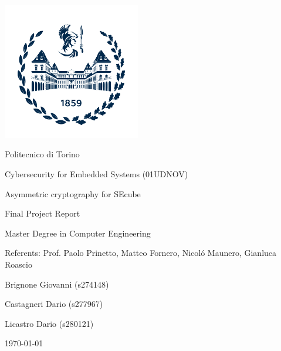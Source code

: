 \documentclass[10pt,  english, a4paper, titlepage, oneside]{book}
\begin{document}
\frontmatter
\begin{titlepage}
\vspace{0cm}
\centerline{
\includegraphics[width=6cm]{./logopolitonuovo}} 
\vspace{0.5cm}
\centerline{\LARGE Politecnico di Torino}
\vspace{2.5cm}
\centerline{\huge Cybersecurity for Embedded Systems (01UDNOV)}
\vspace{1cm}
\centerline{\Huge Asymmetric cryptography for SEcube}
\bigskip
\centerline{\huge Final Project Report}
\vspace{2cm}
\centerline{\Large Master Degree in Computer Engineering}
\vspace{3cm}
%
\centerline{\large Referents: Prof. Paolo Prinetto, Matteo Fornero,
	Nicol\'o Maunero, Gianluca Roascio}
\bigskip
\vspace{1cm}
%
%
\centerline{\large Brignone Giovanni (s274148)}
\centerline{\large Castagneri Dario (s277967)}
\centerline{\large Licastro Dario (s280121)}
%
\vspace{1cm}
\centerline{\large \today}
\end{titlepage}

\tableofcontents


\mainmatter
%    
%




%
%    
%
\appendix

%
\printbibliography
\end{document}
